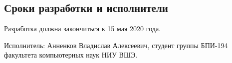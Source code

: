 \subsection{Сроки разработки и исполнители}
Разработка должна закончиться к 15 мая 2020 года.

Исполнитель: Анненков Владислав Алексеевич, студент группы БПИ-194 факультета компьютерных наук НИУ ВШЭ.